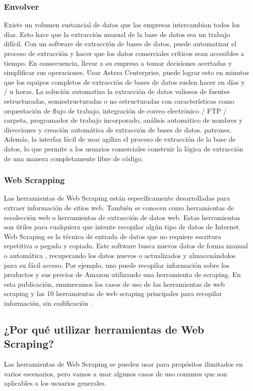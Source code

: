\documentclass[twoside,twocolumn]{article}
\begin{document}
\subsubsection{Envolver}
Existe un volumen sustancial de datos que las empresas intercambian todos los días.
 Esto hace que la extracción manual de la base de datos sea un trabajo difícil. 
 Con un software de extracción de bases de datos, puede automatizar el proceso de 
 extracción y hacer que los datos comerciales críticos sean accesibles a tiempo. 
 En consecuencia, llevar a su empresa a tomar decisiones acertadas y simplificar 
 sus operaciones.
Usar Astera Centerprise, puede lograr esto en minutos que los equipos completos 
de extracción de bases de datos suelen hacer en días y / u horas. La solución 
automatiza la extracción de datos valiosos de fuentes estructuradas, semiestructuradas 
o no estructuradas con características como orquestación de flujo de trabajo, 
integración de correo electrónico / FTP / carpeta, programador de trabajo incorporado, 
análisis automático de nombres y direcciones y creación automática de extracción de
 bases de datos. patrones. Además, la interfaz fácil de usar agiliza el proceso de 
 extracción de la base de datos, lo que permite a los usuarios comerciales construir
  la lógica de extracción de una manera completamente libre de código.


\subsubsection{Web Scrapping} 
Las herramientas de Web Scraping están específicamente desarrolladas para extraer 
información de sitios web. También se conocen como herramientas de recolección web
 o herramientas de extracción de datos web. Estas herramientas son útiles para 
 cualquiera que intente recopilar algún tipo de datos de Internet. Web Scraping 
 es la técnica de entrada de datos que no requiere escritura repetitiva o pegado y copiado.
Este software busca nuevos datos de forma manual o automática , recuperando los 
datos nuevos o actualizados y almacenándolos para su fácil acceso. Por ejemplo, 
uno puede recopilar información sobre los productos y sus precios de Amazon utilizando
 una herramienta de scraping. En esta publicación, enumeramos los casos de uso de las
  herramientas de web scraping y las 10 herramientas de web scraping principales para
   recopilar información, sin codificación .

\subsection{¿Por qué utilizar herramientas de Web Scraping?}  
Las herramientas de Web Scraping se pueden usar para propósitos 
ilimitados en varios escenarios, pero vamos a usar algunos casos
 de uso comunes que son 
aplicables a los usuarios generales.
\end{document}
